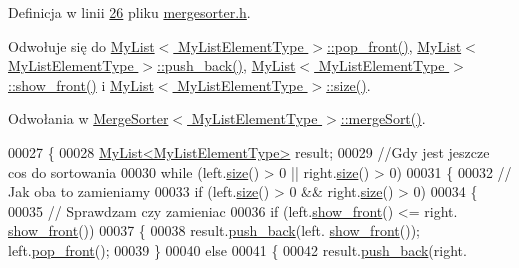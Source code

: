 Definicja w linii \hyperlink{mergesorter_8h_source_l00026}{26} pliku \hyperlink{mergesorter_8h_source}{mergesorter.\-h}.



Odwołuje się do \hyperlink{mylist_8h_source_l00098}{My\-List$<$ My\-List\-Element\-Type $>$\-::pop\-\_\-front()}, \hyperlink{mylist_8h_source_l00112}{My\-List$<$ My\-List\-Element\-Type $>$\-::push\-\_\-back()}, \hyperlink{mylist_8h_source_l00139}{My\-List$<$ My\-List\-Element\-Type $>$\-::show\-\_\-front()} i \hyperlink{mylist_8h_source_l00066}{My\-List$<$ My\-List\-Element\-Type $>$\-::size()}.



Odwołania w \hyperlink{mergesorter_8h_source_l00063}{Merge\-Sorter$<$ My\-List\-Element\-Type $>$\-::merge\-Sort()}.


\begin{DoxyCode}
00027         \{
00028                 \hyperlink{class_my_list}{MyList<MyListElementType>} result;
00029                 \textcolor{comment}{//Gdy jest jeszcze cos do sortowania}
00030                 \textcolor{keywordflow}{while} (left.\hyperlink{class_my_list_a267f669859ef3541333082cad6b28ab7}{size}() > 0 || right.\hyperlink{class_my_list_a267f669859ef3541333082cad6b28ab7}{size}() > 0)
00031                 \{
00032                         \textcolor{comment}{// Jak oba to zamieniamy}
00033                         \textcolor{keywordflow}{if} (left.\hyperlink{class_my_list_a267f669859ef3541333082cad6b28ab7}{size}() > 0 && right.\hyperlink{class_my_list_a267f669859ef3541333082cad6b28ab7}{size}() > 0)
00034                         \{
00035                                 \textcolor{comment}{// Sprawdzam czy zamieniac}
00036                                 \textcolor{keywordflow}{if} (left.\hyperlink{class_my_list_a2fe6cb1e5caf9f1d7d9df4b44faf8506}{show\_front}() <= right.
      \hyperlink{class_my_list_a2fe6cb1e5caf9f1d7d9df4b44faf8506}{show\_front}())
00037                                         \{
00038                                                 result.\hyperlink{class_my_list_a52dad29ecf7522b86df8daa3aa74702d}{push\_back}(left.
      \hyperlink{class_my_list_a2fe6cb1e5caf9f1d7d9df4b44faf8506}{show\_front}()); left.\hyperlink{class_my_list_a675af07472a5b7dde7ca602abb420efa}{pop\_front}();
00039                                         \}
00040                                 \textcolor{keywordflow}{else}
00041                                 \{
00042                                         result.\hyperlink{class_my_list_a52dad29ecf7522b86df8daa3aa74702d}{push\_back}(right.

\end{DoxyCode}
